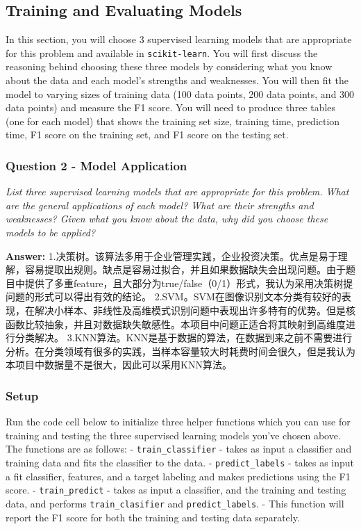 \documentclass{ctexart}
\begin{document}
    \subsection{Training and Evaluating
Models}\label{training-and-evaluating-models}

In this section, you will choose 3 supervised learning models that are
appropriate for this problem and available in \texttt{scikit-learn}. You
will first discuss the reasoning behind choosing these three models by
considering what you know about the data and each model's strengths and
weaknesses. You will then fit the model to varying sizes of training
data (100 data points, 200 data points, and 300 data points) and measure
the F1 score. You will need to produce three tables (one for each model)
that shows the training set size, training time, prediction time, F1
score on the training set, and F1 score on the testing set.

    \subsubsection{Question 2 - Model
Application}\label{question-2---model-application}

\emph{List three supervised learning models that are appropriate for
this problem. What are the general applications of each model? What are
their strengths and weaknesses? Given what you know about the data, why
did you choose these models to be applied?}

    \textbf{Answer: }
1.决策树。该算法多用于企业管理实践，企业投资决策。优点是易于理解，容易提取出规则。缺点是容易过拟合，并且如果数据缺失会出现问题。由于题目中提供了多重feature，且大部分为true/false（0/1）形式，我认为采用决策树提问题的形式可以得出有效的结论。
2.SVM。SVM在图像识别文本分类有较好的表现，在解决小样本、非线性及高维模式识别问题中表现出许多特有的优势。但是核函数比较抽象，并且对数据缺失敏感性。本项目中问题正适合将其映射到高维度进行分类解决。
3.KNN算法。KNN是基于数据的算法，在数据到来之前不需要进行分析。在分类领域有很多的实践，当样本容量较大时耗费时间会很久，但是我认为本项目中数据量不是很大，因此可以采用KNN算法。

    \subsubsection{Setup}\label{setup}

Run the code cell below to initialize three helper functions which you
can use for training and testing the three supervised learning models
you've chosen above. The functions are as follows: -
\texttt{train\_classifier} - takes as input a classifier and training
data and fits the classifier to the data. - \texttt{predict\_labels} -
takes as input a fit classifier, features, and a target labeling and
makes predictions using the F1 score. - \texttt{train\_predict} - takes
as input a classifier, and the training and testing data, and performs
\texttt{train\_clasifier} and \texttt{predict\_labels}. - This function
will report the F1 score for both the training and testing data
separately.
\end{document}
